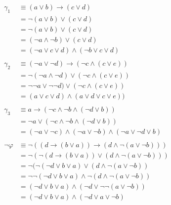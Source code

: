 \documentclass[a4paper]{article}
\begin{document}
\begin{align*}
		\gamma_1{}&\equiv(a\lor b)\rightarrow(c\lor d)\\
			&=\neg(a\lor b)\lor (c\lor d)\\&=\neg(a\lor b)\lor (c\lor d)\\
			&=(\neg a \land \neg b)\lor(c \lor d)\\
			&= (\neg a\lor c\lor d) \land (\neg b\lor c \lor d)\\
			\\
		\gamma_2{}&\equiv(\neg a\lor\neg d)\rightarrow(\neg c\land(c\lor e))\\
			&=\neg(\neg a\land\neg d)\lor(\neg c\land(c\lor e))\\
			&=\neg\neg a\lor\neg\neg d)\lor(\neg c\land(c\lor e))\\
			&=(a\lor c\lor d)\land(a\lor d\lor c\lor e))\\
			\\
		\gamma_3{}&\equiv a \rightarrow(\neg c\land\neg b\land(\neg d\lor b))\\
			&=\neg a\lor(\neg c\land\neg b\land(\neg d\lor b))\\
			&=(\neg a\lor\neg c)\land(\neg a\lor \neg b)\land(\neg a\lor\neg d\lor b)\\
			\\
		\neg\varphi{}&\equiv\neg((d\rightarrow(b\lor a))\rightarrow(d\land\neg(a\lor\neg b)))\\
			&=\neg(\neg(d\rightarrow(b\lor a))\lor(d\land\neg(a\lor\neg b)))\\
			&=\neg(\neg(\neg d\lor b\lor a)\lor(d\land\neg(a\lor\neg b))\\
			&=\neg\neg(\neg d\lor b\lor a)\land\neg(d\land\neg(a\lor\neg b))\\
			&=(\neg d\lor b\lor a)\land(\neg d\lor\neg\neg(a\lor\neg b))\\
			&=(\neg d\lor b\lor a)\land(\neg d\lor a\lor\neg b)\\
\end{align*}
\end{document}
